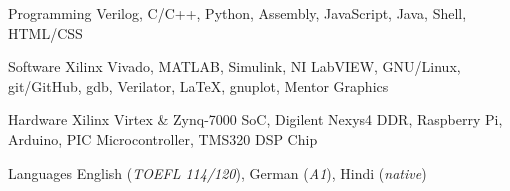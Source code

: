 
\begin{cvskills}

\cvskill
	{Programming} %
	{Verilog, C/C++, Python, Assembly, JavaScript, Java, Shell, HTML/CSS} %

\cvskill
	{Software} %
	{Xilinx Vivado, MATLAB, Simulink, NI LabVIEW, GNU/Linux, git/GitHub, gdb, Verilator, \LaTeX, gnuplot, Mentor Graphics} %

\cvskill
	{Hardware} %
	{Xilinx Virtex \& Zynq-7000 SoC, Digilent Nexys4 DDR, Raspberry Pi, Arduino, PIC Microcontroller, TMS320 DSP Chip} %

\cvskill
	{Languages} %
	{English (\textit{TOEFL 114/120}), German (\textit{A1}), Hindi (\textit{native})} %

\end{cvskills}
